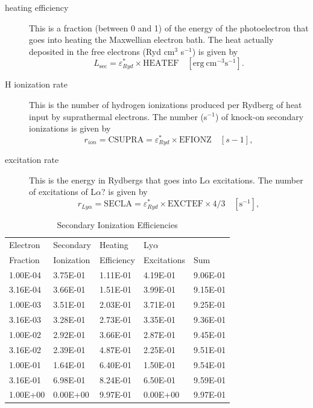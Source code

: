 \begin{description}
\item[heating efficiency]  This is a fraction (between 0 and 1) of the energy of the
photoelectron that goes into heating the Maxwellian electron bath.  The
heat actually deposited in the free electrons (Ryd cm$^3$ s$^{-1}$) is given by
\begin{equation}
{L_{\sec }} = \varepsilon _{Ryd}^* \times {\mathrm{HEATEF}}
\quad [\mathrm{erg~cm}^{-3} \mathrm{s}^{-1}].
\end{equation}
\item[H ionization rate]  This is the number of hydrogen ionizations produced per Rydberg
of heat input by suprathermal electrons. The number (s$^{-1}$) of knock-on
secondary ionizations is given by
\begin{equation}
{r_{ion}} = {\mathrm{CSUPRA}} = \varepsilon _{Ryd}^* \times {\mathrm{EFIONZ}}
\quad [s-1],
\end{equation}
\item[excitation rate]  This is the energy in Rydbergs that goes into L$\alpha $ excitations.
The number of excitations of L$\alpha $? is given by
\begin{equation}
{r_{Ly\alpha }} = {\mathrm{SECLA}} = \varepsilon _{Ryd}^* \times {\mathrm{EXCTEF}}
\times {\mathrm{4/3}}\quad [\mathrm{s}^{-1}] ,
\end{equation}
\end{description}

\begin{table}
\caption{Secondary Ionization Efficiencies}
\begin{tabular}{lllll}
\hline
Electron& Secondary& Heating& Ly$\alpha $\\
Fraction& Ionization& Efficiency& Excitations& Sum\\
\hline
1.00E-04& 3.75E-01& 1.11E-01& 4.19E-01& 9.06E-01\\
3.16E-04& 3.66E-01& 1.51E-01& 3.99E-01& 9.15E-01\\
1.00E-03& 3.51E-01& 2.03E-01& 3.71E-01& 9.25E-01\\
3.16E-03& 3.28E-01& 2.73E-01& 3.35E-01& 9.36E-01\\
1.00E-02& 2.92E-01& 3.66E-01& 2.87E-01& 9.45E-01\\
3.16E-02& 2.39E-01& 4.87E-01& 2.25E-01& 9.51E-01\\
1.00E-01& 1.64E-01& 6.40E-01& 1.50E-01& 9.54E-01\\
3.16E-01& 6.98E-01& 8.24E-01& 6.50E-01& 9.59E-01\\
1.00E+00& 0.00E+00& 9.97E-01& 0.00E+00& 9.97E-01\\
\hline
\end{tabular}
\end{table}

